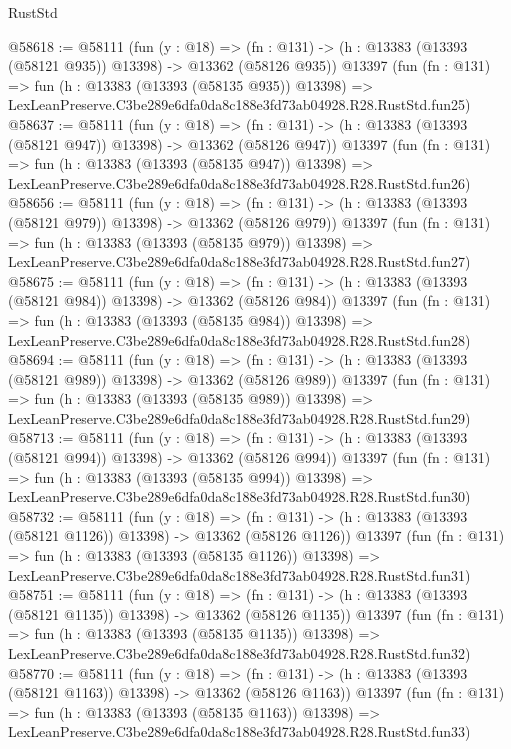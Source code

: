 \begin{lexlean}{RustStd}
\begin{coremodule}
@58618 := @58111
    (fun (y : @18) =>
    (fn : @131) -> (h : @13383 (@13393 (@58121 @935)) @13398) -> @13362 (@58126 @935))
    @13397
    (fun (fn : @131) =>
    fun (h : @13383 (@13393 (@58135 @935)) @13398) =>
    LexLeanPreserve.C3be289e6dfa0da8c188e3fd73ab04928.R28.RustStd.fun25)
@58637 := @58111
    (fun (y : @18) =>
    (fn : @131) -> (h : @13383 (@13393 (@58121 @947)) @13398) -> @13362 (@58126 @947))
    @13397
    (fun (fn : @131) =>
    fun (h : @13383 (@13393 (@58135 @947)) @13398) =>
    LexLeanPreserve.C3be289e6dfa0da8c188e3fd73ab04928.R28.RustStd.fun26)
@58656 := @58111
    (fun (y : @18) =>
    (fn : @131) -> (h : @13383 (@13393 (@58121 @979)) @13398) -> @13362 (@58126 @979))
    @13397
    (fun (fn : @131) =>
    fun (h : @13383 (@13393 (@58135 @979)) @13398) =>
    LexLeanPreserve.C3be289e6dfa0da8c188e3fd73ab04928.R28.RustStd.fun27)
@58675 := @58111
    (fun (y : @18) =>
    (fn : @131) -> (h : @13383 (@13393 (@58121 @984)) @13398) -> @13362 (@58126 @984))
    @13397
    (fun (fn : @131) =>
    fun (h : @13383 (@13393 (@58135 @984)) @13398) =>
    LexLeanPreserve.C3be289e6dfa0da8c188e3fd73ab04928.R28.RustStd.fun28)
@58694 := @58111
    (fun (y : @18) =>
    (fn : @131) -> (h : @13383 (@13393 (@58121 @989)) @13398) -> @13362 (@58126 @989))
    @13397
    (fun (fn : @131) =>
    fun (h : @13383 (@13393 (@58135 @989)) @13398) =>
    LexLeanPreserve.C3be289e6dfa0da8c188e3fd73ab04928.R28.RustStd.fun29)
@58713 := @58111
    (fun (y : @18) =>
    (fn : @131) -> (h : @13383 (@13393 (@58121 @994)) @13398) -> @13362 (@58126 @994))
    @13397
    (fun (fn : @131) =>
    fun (h : @13383 (@13393 (@58135 @994)) @13398) =>
    LexLeanPreserve.C3be289e6dfa0da8c188e3fd73ab04928.R28.RustStd.fun30)
@58732 := @58111
    (fun (y : @18) =>
    (fn : @131) -> (h : @13383 (@13393 (@58121 @1126)) @13398) -> @13362 (@58126 @1126))
    @13397
    (fun (fn : @131) =>
    fun (h : @13383 (@13393 (@58135 @1126)) @13398) =>
    LexLeanPreserve.C3be289e6dfa0da8c188e3fd73ab04928.R28.RustStd.fun31)
@58751 := @58111
    (fun (y : @18) =>
    (fn : @131) -> (h : @13383 (@13393 (@58121 @1135)) @13398) -> @13362 (@58126 @1135))
    @13397
    (fun (fn : @131) =>
    fun (h : @13383 (@13393 (@58135 @1135)) @13398) =>
    LexLeanPreserve.C3be289e6dfa0da8c188e3fd73ab04928.R28.RustStd.fun32)
@58770 := @58111
    (fun (y : @18) =>
    (fn : @131) -> (h : @13383 (@13393 (@58121 @1163)) @13398) -> @13362 (@58126 @1163))
    @13397
    (fun (fn : @131) =>
    fun (h : @13383 (@13393 (@58135 @1163)) @13398) =>
    LexLeanPreserve.C3be289e6dfa0da8c188e3fd73ab04928.R28.RustStd.fun33)

\end{coremodule}
\end{lexlean}
